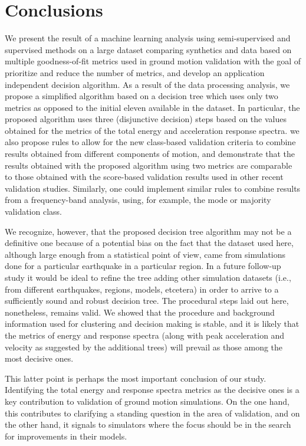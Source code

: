 
\section{Conclusions}

We present the result of a machine learning analysis using semi-supervised and supervised methods on a large dataset comparing synthetics and data based on multiple goodness-of-fit metrics used in ground motion validation with the goal of prioritize and reduce the number of metrics, and develop an application independent decision algorithm. As a result of the data processing analysis, we propose a simplified algorithm based on a decision tree which uses only two metrics as opposed to the initial eleven available in the dataset. In particular, the proposed algorithm uses three (disjunctive decision) steps based on the values obtained for the metrics of the total energy and acceleration response spectra. we also propose rules to allow for the new class-based validation criteria to combine results obtained from different components of motion, and demonstrate that the results obtained with the proposed algorithm using two metrics are comparable to those obtained with the score-based validation results used in other recent validation studies. Similarly, one could implement similar rules to combine results from a frequency-band analysis, using, for example, the mode or majority validation class. 

We recognize, however, that the proposed decision tree algorithm may not be a definitive one because of a potential bias on the fact that the dataset used here, although large enough from a statistical point of view, came from simulations done for a particular earthquake in a particular region. In a future follow-up study it would be ideal to refine the tree adding other simulation datasets (i.e., from different earthquakes, regions, models, etcetera) in order to arrive to a sufficiently sound and robust decision tree. The procedural steps laid out here, nonetheless, remains valid. We showed that the procedure and background information used for clustering and decision making is stable, and it is likely that the metrics of energy and response spectra (along with peak acceleration and velocity as suggested by the additional trees) will prevail as those among the most decisive ones.

This latter point is perhaps the most important conclusion of our study. Identifying the total energy and response spectra metrics as the decisive ones is a key contribution to validation of ground motion simulations. On the one hand, this contributes to clarifying a standing question in the area of validation, and on the other hand, it signals to simulators where the focus should be in the search for improvements in their models.

